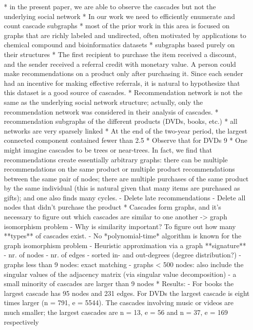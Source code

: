 	* in the present paper, we are able to observe the cascades but not the underlying social network
	* In our work we need to efficiently enumerate and count cascade subgraphs
	* most of the prior work in this area is focused on graphs that are richly
	labeled and undirected, often motivated by applications to chemical compound
	and bioinformatics datasets
	* subgraphs based purely on their structures
	* The first recipient to purchase the item received a discount, and the sender received a referral credit with monetary value. A person could make recommendations on a product only after purchasing it. Since each sender had an incentive for making effective referrals, it is natural to hypothesize that this dataset is a good source of cascades.
	* Recommendation network is not the same as the underlying social network structure; actually, only the recommendation network was considered in their analysis of cascades.
	* recommendation subgraphs of the different products (DVDs, books, etc.)
	* all networks are very sparsely linked
	* At the end of the two-year period, the largest connected component contained fewer than 2.5%
	* Observe that for DVDs 9%
	* One might imagine cascades to be trees or near-trees. In fact, we find that recommendations create essentially arbitrary graphs: there can be multiple recommendations on the same product or multiple product recommendations between the same pair of nodes; there are multiple purchases of the same product by the same individual (this is natural given that many items are purchased as gifts); and one also finds many cycles.
	- Delete late recommendations
	- Delete all nodes that didn't purchase the product
	* Cascades form graphs, and it's necessary to figure out which cascades are similar to one another -> graph isomorphism problem
	- Why is similarity important? To figure out how many **types** of cascades exist.
	- No *polynomial-time* algorithm is known for the graph isomorphism problem
	- Heuristic approximation via a graph **signature**
	- nr. of nodes
	- nr. of edges
	- sorted in- and out-degrees (degree distribution?)
	- graphs less than 9 nodes: exact matching
	- graphs < 500 nodes: also include the singular values of the adjacency matrix (via singular value decomposition)
	- a small minority of cascades are larger than 9 nodes
	* Results:
	- For books the largest cascade has 95 nodes and 231 edges. For DVDs the largest cascade is eight times larger (n = 791, e = 5544). The cascades involving music or videos are much smaller; the largest cascades are n = 13, e = 56 and n = 37, e = 169 respectively
